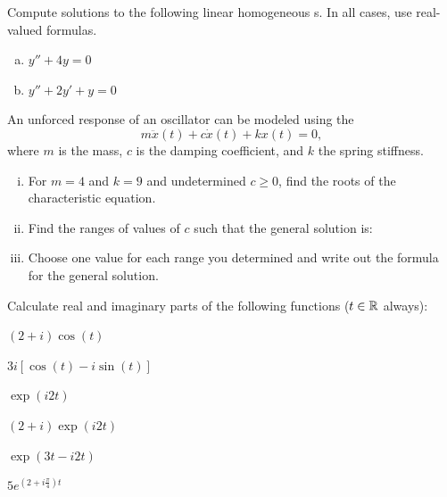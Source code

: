   \begin{question}
    Compute solutions to the following linear homogeneous \ode{}s. In all cases, use real-valued formulas.
    \begin{enumerate}[(a)]
      \item \(y'' + 4y = 0\) \solspace{.2in}
      \item \(y''+2y'+y = 0 \)
    \end{enumerate}
  \end{question}


  \begin{question}
    An unforced response of an oscillator can be modeled using the \ode{} 
    \[m \ddot x(t) + c \dot x(t) + k x(t) = 0,\]
    where \(m\) is the mass, \(c\) is the damping coefficient, and \(k\) the spring 
    stiffness.  
    \begin{enumerate}[(i)]
      \item  For \(m=4\) and \(k = 9\) and undetermined \(c \geq 0\), find the roots of the characteristic equation.
      \item Find the ranges of values of \(c\) such that the general solution is:
      \item Choose one value for each range you determined and write out the formula for the general solution.
      \end{enumerate}
  \end{question}


  \begin{question}
    Calculate real and imaginary parts of the following functions (\(t\in\mathbb{R}\) always):
    \begin{colenumerate}[3]
      \item \((2+i)\cos(t)\)
      \item \(3i[ \cos(t) - i\sin (t) ]\)
      \item \(\exp( i2t )\)
      \item \((2+i)\exp( i2t )\)
      \item \(\exp(3t-i2t )\)
      \item \(5e^{\left(2+i \tfrac{\pi}{4}\right)t}\)
    \end{colenumerate}
  \end{question}

